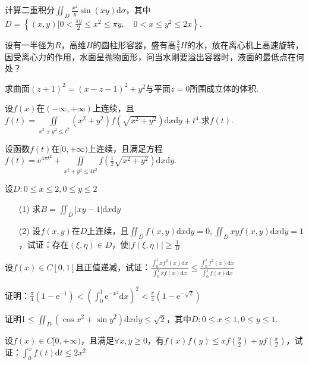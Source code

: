 \begin{xiti}
	\item 计算二重积分$\iint_{D} \frac{x^{2}}{y} \sin (x y) \mathrm{d} \sigma$，其中$D=\left\{(x, y) | 0<\frac{\pi y}{2} \leqslant x^{2} \leqslant \pi y, \quad 0<x \leqslant y^{2} \leqslant 2 x\right\}$.
	\item 设有一半径为$R$，高维$H$的圆柱形容器，盛有高$\frac{2}{3}H$的水，放在离心机上高速旋转，因受离心力的作用，水面呈抛物面形，问当水刚要溢出容器时，液面的最低点在何处？
	
	\item 求曲面$(z+1)^{2}=(x-z-1)^{2}+y^{2}$与平面$z=0$所围成立体的体积.
	
	\item 设$f(x)$在$(-\infty,+\infty)$上连续，且$f\left(t\right)=\iint\limits_{x^2+y^2\leq t^2}{\left(x^2+y^2\right)}f\left(\sqrt{x^2+y^2}\right)\textrm{d}x\textrm{d}y+t^4$.求$f(t)$.
	\item 	设函数$f(t)$在$[0,+\infty)$上连续，且满足方程$f\left(t\right)=\textrm{e}^{4\pi t^2}+\iint\limits_{x^2+y^2\leq 4t^2}{f\left(\frac{1}{2}\sqrt{x^2+y^2}\right)\textrm{d}x\textrm{d}y}$.
	
	\item 设$D : 0 \leqslant x \leqslant 2,0 \leqslant y \leqslant 2$
	\begin{enumerate}
		\item [(1)] 求$B=\iint_{D}|x y-1| \mathrm{d} x \mathrm{d} y$
		\item [(2)]设$f(x,y)$在$D$上连续，且$\iint_{D} f(x, y) \mathrm{d} x \mathrm{d} y=0, \iint_{D} x y f(x, y) \mathrm{d} x \mathrm{d} y=1$，试证：存在$(\xi, \eta) \in D$，使$|f(\xi, \eta)| \geqslant \frac{1}{B}$
	\end{enumerate}
	\item 设$f(x) \in C[0,1]$且正值递减，试证：$\frac{\int_{0}^{1} x f^{2}(x) \mathrm{d} x}{\int_{0}^{1} x f(x) \mathrm{d} x} \leqslant \frac{\int_{0}^{1} f^{2}(x) \mathrm{d} x}{\int_{0}^{1} f(x) \mathrm{d} x}$
	\item 证明：$\frac{\pi}{4}\left(1-\mathrm{e}^{-1}\right)<\left(\int_{0}^{1} \mathrm{e}^{-x^{2}} \mathrm{d} x\right)^{2}<\frac{\pi}{4}\left(1-\mathrm{e}^{-\sqrt{2}}\right)$
	\item 证明1$\leqslant \iint_{D}\left(\cos x^{2}+\sin y^{2}\right) \mathrm{d} x \mathrm{d} y \leqslant \sqrt{2}$，其中$D : 0 \leqslant x \leqslant 1,0 \leqslant y \leqslant 1$.
	\item 	设$f(x) \in C[0,+\infty)$，且满足$\forall x, y \geqslant 0$，有$f(x) f(y) \leqslant x f\left(\frac{y}{2}\right)+y f\left(\frac{x}{2}\right)$，试证：$\int_{0}^{x} f(t) \mathrm{d} t \leqslant 2 x^{2}$
\end{xiti}



